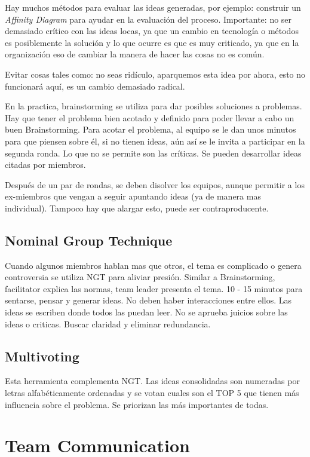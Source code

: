 \documentclass[oneside]{book}
\begin{document}
Hay muchos métodos para evaluar las ideas generadas, por ejemplo: construir un \textit{Affinity Diagram} para ayudar en la evaluación del proceso. Importante: no ser demasiado crítico con las ideas locas, ya que un cambio en tecnología o métodos es posiblemente la solución y lo que ocurre es que es muy criticado, ya que en la organización eso de cambiar la manera de hacer las cosas no es común.

Evitar cosas tales como: no seas ridículo, aparquemos esta idea por ahora, esto no funcionará aquí, es un cambio demasiado radical.

En la practica, brainstorming se utiliza para dar posibles soluciones a problemas. Hay que tener el problema bien acotado y definido para poder llevar a cabo un buen Brainstorming.
Para acotar el problema, al equipo se le dan unos minutos para que piensen sobre él, si no tienen ideas, aún así se le invita a participar en la segunda ronda. Lo que no se permite son las críticas.
Se pueden desarrollar ideas citadas por miembros.

Después de un par de rondas, se deben disolver los equipos, aunque permitir a los ex-miembros que vengan a seguir apuntando ideas (ya de manera mas individual). Tampoco hay que alargar esto, puede ser contraproducente.

\subsection{Nominal Group Technique}

Cuando algunos miembros hablan mas que otros, el tema es complicado o genera controversia se utiliza NGT para aliviar presión. 
Similar a Brainstorming, facilitator explica las normas, team leader presenta el tema. 10 - 15 minutos para sentarse, pensar y generar ideas. No deben haber interacciones entre ellos. Las ideas se escriben donde todos las puedan leer. No se aprueba juicios sobre las ideas o criticas. Buscar claridad y eliminar redundancia.

\subsection{Multivoting}

Esta herramienta complementa NGT. Las ideas consolidadas son numeradas por letras alfabéticamente ordenadas y se votan cuales son el TOP 5 que tienen más influencia sobre el problema. Se priorizan las más importantes de todas.

\section{Team Communication}
\end{document}
